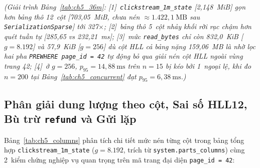 \documentclass[13pt,a4paper]{report}
\begin{document}
\noindent\textit{(Giải trình Bảng~\ref{tab:ch5_36m}: [1]~\texttt{clickstream\_\allowbreak{}1m\_\allowbreak{}state} [2,148~MiB] gọn hơn bảng thô 12~cột [703,05~MiB, chưa nén $\approx 1.422{,}1~\text{MB}$ sau \texttt{SerializationSparse}] tới 327${\times}$; [2]~bảng thô 5~cột nhảy khối rời rạc chậm hơn quét tuần tự [285,65 vs 232,21~ms]; [3]~mức \texttt{read\_\allowbreak{}bytes} chỉ còn 832,0~KiB [$g=8.192$] và 57,9~KiB [$g=256$] dù cột HLL cả bảng nặng 159,06~MB là nhờ lọc hai pha \texttt{PREWHERE page\_\allowbreak{}id = 42} tự động bỏ qua giải nén cột HLL ngoài vùng trang 42; [4]~ở $g = 256$, $p_{95} = 14{,}88~\text{ms}$ trên $n=15$ bị kéo bởi 1~ngoại lệ, khi đo $n = 200$ tại Bảng~\ref{tab:ch5_concurrent} đạt $p_{95} = 6{,}38~\text{ms}$.)}

\subsection{Phân giải dung lượng theo cột, Sai số HLL12, Bù trừ \texorpdfstring{\texttt{refund}}{refund} và Gửi lặp}
Bảng~\ref{tab:ch5_columns} phân tích chi tiết mức nén từng cột trong bảng tổng hợp \texttt{clickstream\_\allowbreak{}1m\_\allowbreak{}state} ($g = 8.192$, trích từ \texttt{system.\allowbreak{}parts\_\allowbreak{}columns}) cùng 2~kiểm chứng nghiệp vụ quan trọng trên mã trang đại diện \texttt{page\_\allowbreak{}id = 42}:
\end{document}
